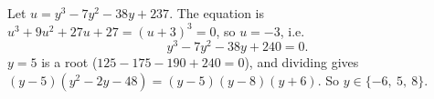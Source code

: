 Let $u=y^3-7y^2-38y+237$. The equation is $u^3+9u^2+27u+27=(u+3)^3=0$, so $u=-3$, i.e.
\[y^3-7y^2-38y+240=0.\]
$y=5$ is a root ($125-175-190+240=0$), and dividing gives $(y-5)\left(y^2-2y-48\right)=(y-5)(y-8)(y+6)$. So $\boxed{y\in\{-6,\ 5,\ 8\}}$.
